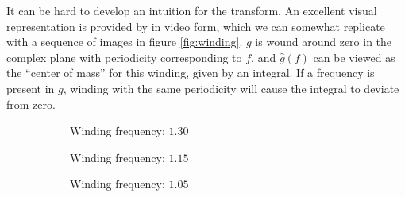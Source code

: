 It can be hard to develop an intuition for the transform.
An excellent visual representation is provided by \cite{3blue} in video form,
which we can somewhat replicate with a sequence of images in figure \ref{fig:winding}.
$g$ is wound around zero in the complex plane with periodicity corresponding to $f$,
and $\hat g(f)$ can be viewed as the ``center of mass'' for this winding, given by an integral.
If a frequency is present in $g$,
winding with the same periodicity will cause the integral to deviate from zero.
\begin{figure}
    \centering
    \begin{subfigure}[b]{0.45\textwidth}
    \caption{Winding frequency: $1.30$\label{fig:windinga}}
    \end{subfigure}
    \begin{subfigure}[b]{0.45\textwidth}
    \caption{Winding frequency: $1.15$\label{fig:windingb}}
    \end{subfigure}
    \begin{subfigure}[b]{0.45\textwidth}
    \caption{Winding frequency: $1.05$\label{fig:windingc}}
    \end{subfigure}
    \begin{subfigure}[b]{0.45\textwidth}

\end{subfigure}
\end{figure}
